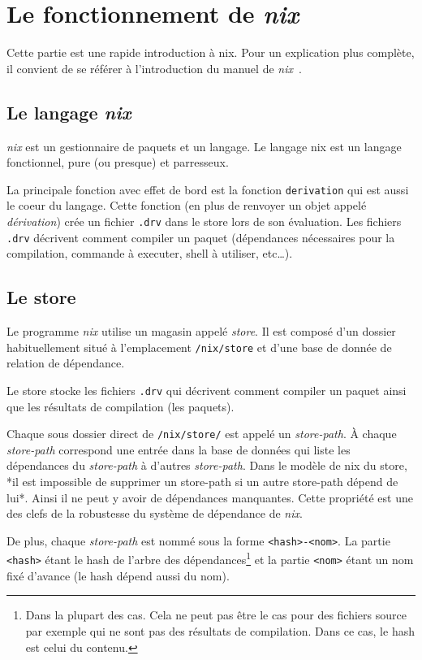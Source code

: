 \documentclass[a4paper,12pt]{article}
\begin{document}
\section{Le fonctionnement de \emph{nix}}

Cette partie est une rapide introduction à nix. Pour un explication plus
complète, il convient de se référer à l'introduction du manuel de
\emph{nix}~\cite{nix}.

\subsection{Le langage \emph{nix}}

\emph{nix} est un gestionnaire de paquets et un langage. Le langage nix est un
langage fonctionnel, pure (ou presque) et parresseux.

La principale fonction avec effet de bord est la fonction \texttt{derivation} qui est
aussi le coeur du langage. Cette fonction (en plus de renvoyer un objet appelé
\emph{dérivation}) crée un fichier \texttt{.drv} dans le store lors de son
évaluation. Les fichiers \texttt{.drv} décrivent comment compiler un paquet
(dépendances nécessaires pour la compilation, commande à executer, shell à
utiliser, etc\dots).

\subsection{Le store}

Le programme \emph{nix} utilise un magasin appelé \emph{store}. Il est composé d'un
dossier habituellement
situé à l'emplacement \texttt{/nix/store} et d'une base de donnée de relation de
dépendance.

Le store stocke  les fichiers \texttt{.drv}
qui décrivent comment compiler un paquet ainsi que les résultats de
compilation (les paquets).

Chaque sous dossier direct de \texttt{/nix/store/} est appelé un \emph{store-path}.
\`A chaque \emph{store-path} correspond une entrée dans la base de données qui liste
les dépendances du \emph{store-path} à d'autres \emph{store-path}. Dans le modèle de nix
du store, *il est impossible de supprimer un store-path si un autre store-path
dépend de lui*. Ainsi il ne peut y avoir de dépendances manquantes. Cette
propriété est une des clefs de la robustesse du système de dépendance de \emph{nix}.

De plus, chaque \emph{store-path} est nommé sous la forme \texttt{<hash>-<nom>}. La partie
\texttt{<hash>} étant le hash de l'arbre des dépendances\footnote{\label{note:fod}Dans la plupart des
cas. Cela ne peut pas être le cas pour des fichiers source par exemple qui ne
sont pas des résultats de compilation. Dans ce cas, le hash est celui du
contenu.} et la partie \texttt{<nom>} étant un nom fixé d'avance (le hash dépend aussi
du nom).
\end{document}
